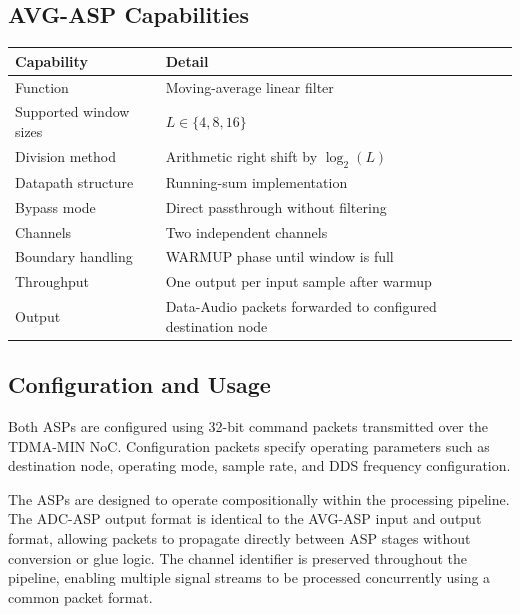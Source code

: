 \documentclass[10pt, a4paper]{article}
\begin{document}
\subsection{AVG-ASP Capabilities}

\begin{center}
\begin{tabular}{|p{4cm}|p{9cm}|}
    \hline
    \textbf{Capability}     & \textbf{Detail} \\ \hline
    Function                & Moving-average linear filter \\ \hline
    Supported window sizes  & $L \in \{4,8,16\}$ \\ \hline
    Division method         & Arithmetic right shift by $\log_2(L)$ \\ \hline
    Datapath structure      & Running-sum implementation \\ \hline
    Bypass mode             & Direct passthrough without filtering \\ \hline
    Channels                & Two independent channels \\ \hline
    Boundary handling       & WARMUP phase until window is full \\ \hline
    Throughput              & One output per input sample after warmup \\ \hline
    Output                  & Data-Audio packets forwarded to configured destination node \\ \hline
\end{tabular}
\end{center}

\subsection{Configuration and Usage}

Both ASPs are configured using 32-bit command packets transmitted over the TDMA-MIN NoC. Configuration packets specify operating parameters such as destination node, operating mode, sample rate, and DDS frequency configuration.

The ASPs are designed to operate compositionally within the processing pipeline. The ADC-ASP output format is identical to the AVG-ASP input and output format, allowing packets to propagate directly between ASP stages without conversion or glue logic. The channel identifier is preserved throughout the pipeline, enabling multiple signal streams to be processed concurrently using a common packet format.
\end{document}
